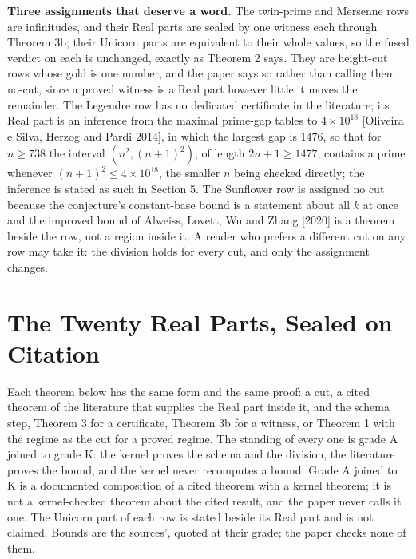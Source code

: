 \documentclass[10pt,twocolumn]{article}
\begin{document}
\textbf{Three assignments that deserve a word.} The twin-prime and
Mersenne rows are infinitudes, and their Real parts are sealed by one
witness each through Theorem 3b; their Unicorn parts are equivalent to
their whole values, so the fused verdict on each is unchanged, exactly
as Theorem 2 says. They are height-cut rows whose gold is one number,
and the paper says so rather than calling them no-cut, since a proved
witness is a Real part however little it moves the remainder. The
Legendre row has no dedicated certificate in the literature; its Real
part is an inference from the maximal prime-gap tables to
\(4 \times 10^{18}\) {[}Oliveira e Silva, Herzog and Pardi 2014{]}, in
which the largest gap is \(1476\), so that for \(n \ge 738\) the
interval \((n^2, (n+1)^2)\), of length \(2n+1 \ge 1477\), contains a
prime whenever \((n+1)^2 \le 4 \times 10^{18}\), the smaller \(n\) being
checked directly; the inference is stated as such in Section 5. The
Sunflower row is assigned no cut because the conjecture's constant-base
bound is a statement about all \(k\) at once and the improved bound of
Alweiss, Lovett, Wu and Zhang {[}2020{]} is a theorem beside the row,
not a region inside it. A reader who prefers a different cut on any row
may take it: the division holds for every cut, and only the assignment
changes.

\hypertarget{the-twenty-real-parts-sealed-on-citation}{%
\section{The Twenty Real Parts, Sealed on
Citation}\label{the-twenty-real-parts-sealed-on-citation}}

Each theorem below has the same form and the same proof: a cut, a cited
theorem of the literature that supplies the Real part inside it, and the
schema step, Theorem 3 for a certificate, Theorem 3b for a witness, or
Theorem 1 with the regime as the cut for a proved regime. The standing
of every one is grade A joined to grade K: the kernel proves the schema
and the division, the literature proves the bound, and the kernel never
recomputes a bound. Grade A joined to K is a documented composition of a
cited theorem with a kernel theorem; it is not a kernel-checked theorem
about the cited result, and the paper never calls it one. The Unicorn
part of each row is stated beside its Real part and is not claimed.
Bounds are the sources', quoted at their grade; the paper checks none of
them.
\end{document}

